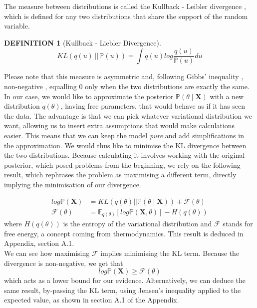 \documentclass[12pt]{report}
\newtheorem{definition}[theorem]{DEFINITION}
\newcommand{\bs}{\boldsymbol}
\newcommand{\mc}[1]{\mathcal{#1}}
\newcommand{\E}{\mathbb{E}}
\renewcommand{\P}{\mathbb{P}}
\renewcommand{\bs}{\boldsymbol}
\begin{document}
\noindent
The measure between distributions is called the Kullback - Leibler divergence , which is defined for any two distributions that share the support of the random variable.

\begin{definition}[Kullback - Liebler Divergence]
\begin{equation*}
    KL(q(u)\, ||\, \mathbb{P}(u)) = \int q(u) log \frac{q(u)}{\mathbb{P}(u)} du
\end{equation*}
\end{definition}
\noindent
Please note that this measure is asymmetric and, following Gibbs' inequality , non-negative , equalling 0 only when the two distributions are exactly the same. \\

\noindent
In our case, we would like to approximate the posterior $\P(\theta \mid \bs{X})$ with a new distribution $q(\theta)$, having free parameters, that would behave as if it has seen the data. The advantage is that we can pick whatever variational distribution we want, allowing us to insert extra assumptions that would make calculations easier. This means that we can keep the model \textit{pure} and add simplifications in the approximation. We would thus like to minimise the KL divergence between the two distributions. Because calculating it involves working with the original posterior, which posed problems from the beginning, we rely on the following result, which rephrases the problem as maximising a different term, directly implying the minimisation of our divergence.

\begin{align}
    log\mathbb{P}(\textbf{X}) &= KL(q(\theta) || \mathbb{P}(\theta \mid \textbf{X})) + \mc{F}(\theta) \\
    \mc{F}(\theta) &= \E_{q(\theta)}[log\mathbb{P}(\textbf{X}, \theta)] - H(q(\theta))
\end{align}
\noindent
where $H(q(\theta))$ is the entropy of the variational distribution and $\mc{F}$ stands for free energy, a concept coming from thermodynamics. This result is deduced in Appendix, section A.1. \\

\noindent
We can see how maximising $\mc{F}$ implies minimising the KL term. Because the divergence is non-negative, we get that
\begin{equation}
    log \P(\bs{X}) \geq \mc{F}(\theta)
\end{equation}
which acts as a lower bound for our evidence. Alternatively, we can deduce the same result, by-passing the KL term, using Jensen's inequality applied to the expected value, as shown in section A.1 of the Appendix.\\
\end{document}
